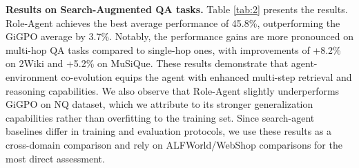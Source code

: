 \documentclass{llmxive}
\providecommand{\arraystretch}{1}
\begin{document}
\begin{table}[t]
\vspace{-0.2cm}
\begin{center} 
\renewcommand{\arraystretch}{1}   
\setlength\tabcolsep{3pt} 
\end{center}
\vspace{-0.4cm}
\caption{Ablation study of components with Qwen2.5-1.5B-Instruct. We report the average success rate.}\label{tab:abl} 
\vspace{-0.5cm}
\end{table}
 
\noindent\textbf{Results on Search-Augmented QA tasks.}
Table \ref{tab:2} presents the results. Role-Agent achieves the best average performance of 45.8\%, outperforming the GiGPO average by 3.7\%. Notably, the performance gains are more pronounced on multi-hop QA tasks compared to single-hop ones, with improvements of +8.2\% on 2Wiki and +5.2\% on MuSiQue. These results demonstrate that agent-environment co-evolution equips the agent with enhanced multi-step retrieval and reasoning capabilities. We also observe that Role-Agent slightly underperforms GiGPO on NQ dataset, which we attribute to its stronger generalization capabilities rather than overfitting to the training set.
Since search-agent baselines differ in training and evaluation protocols, we use these results as a cross-domain comparison and rely on ALFWorld/WebShop comparisons for the most direct assessment.
\end{document}
